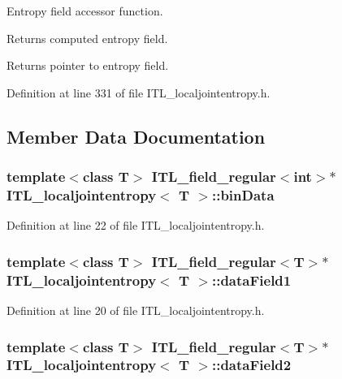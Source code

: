 Entropy field accessor function. 

Returns computed entropy field. \begin{DoxyReturn}{Returns}
pointer to entropy field. 
\end{DoxyReturn}


Definition at line 331 of file ITL\_\-localjointentropy.h.



\subsection{Member Data Documentation}
\hypertarget{classITL__localjointentropy_a3464cac89446ff42d3c39a703f7e35fe}{
\subsubsection[{binData}]{\setlength{\rightskip}{0pt plus 5cm}template$<$class T$>$ {\bf ITL\_\-field\_\-regular}$<$int$>$$\ast$ {\bf ITL\_\-localjointentropy}$<$ T $>$::{\bf binData}}}
\label{classITL__localjointentropy_a3464cac89446ff42d3c39a703f7e35fe}


Definition at line 22 of file ITL\_\-localjointentropy.h.

\hypertarget{classITL__localjointentropy_a8ff2f16dad74ac2c1e6d9e2669c49990}{
\subsubsection[{dataField1}]{\setlength{\rightskip}{0pt plus 5cm}template$<$class T$>$ {\bf ITL\_\-field\_\-regular}$<$T$>$$\ast$ {\bf ITL\_\-localjointentropy}$<$ T $>$::{\bf dataField1}}}
\label{classITL__localjointentropy_a8ff2f16dad74ac2c1e6d9e2669c49990}


Definition at line 20 of file ITL\_\-localjointentropy.h.

\hypertarget{classITL__localjointentropy_a68b8981e78713334160e6c1c0dd522ff}{
\subsubsection[{dataField2}]{\setlength{\rightskip}{0pt plus 5cm}template$<$class T$>$ {\bf ITL\_\-field\_\-regular}$<$T$>$$\ast$ {\bf ITL\_\-localjointentropy}$<$ T $>$::{\bf dataField2}}}
\label{classITL__localjointentropy_a68b8981e78713334160e6c1c0dd522ff}


